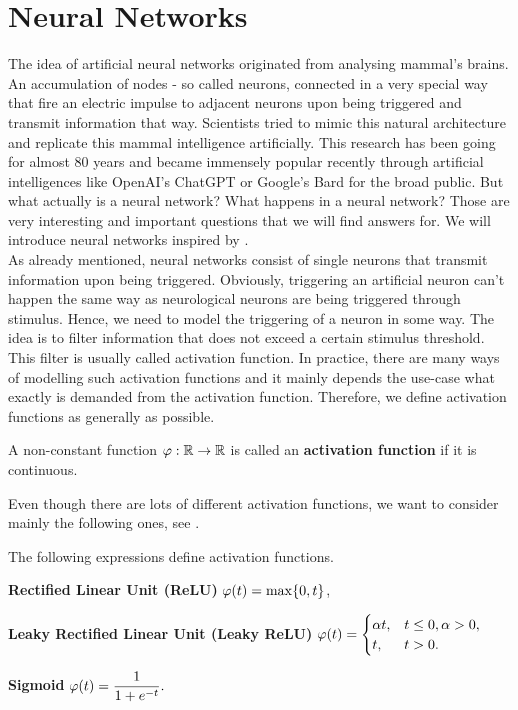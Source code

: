 \section{Neural Networks}\label{sec:nn}
The idea of artificial neural networks originated from analysing mammal's brains. An accumulation of nodes - so called neurons, connected in a very special way that fire an electric impulse to adjacent neurons upon being triggered and transmit information that way. Scientists tried to mimic this natural architecture and replicate this mammal intelligence artificially. This research has been going for almost 80 years and became immensely popular recently through artificial intelligences like OpenAI's ChatGPT or Google's Bard for the broad public. But what actually is a neural network? What happens in a neural network? Those are very interesting and important questions that we will find answers for. We will introduce neural networks inspired by \cite[Chapter~3]{mucke2019empirical}.\\
 As already mentioned, neural networks consist of single neurons that transmit information upon being \glqq triggered\grqq{}. Obviously, triggering an artificial neuron can't happen the same way as neurological neurons are being triggered through stimulus. Hence, we need to model the triggering of a neuron in some way. The idea is to filter information that does not exceed a certain stimulus threshold. This filter is usually called activation function. In practice, there are many ways of modelling such activation functions and it mainly depends the use-case what exactly is demanded from the activation function. Therefore, we define activation functions as generally as possible.

\begin{definition}
A non-constant function $\operatorname{\varphi}: \operatorname{\mathbb{R}} \to \operatorname{\mathbb{R}}$ is called an \textbf{activation function} if it is continuous.
\end{definition}


Even though there are lots of different activation functions, we want to consider mainly the following ones, see \cite[Chapter~6]{goodfellow2016deep}.


\begin{example}
The following expressions define activation functions.
\begin{mydescription}{}
\item[\textbf{Rectified Linear Unit (ReLU)}] $\operatorname{\varphi}(t) = \max\{0, t\}$,
\item[\textbf{Leaky Rectified Linear Unit (Leaky ReLU)}] $\displaystyle \operatorname{\varphi}(t) = \begin{cases}
\alpha t, 	& t \leq 0, \alpha>0,\\
t,		& t > 0.
\end{cases}$
\item[\textbf{Sigmoid}] $\displaystyle \operatorname{\varphi}(t) = \frac{1}{1 + e^{-t}}.$
\end{mydescription}
\end{example}


